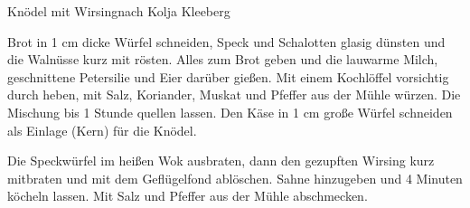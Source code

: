 \begin{recipe}{Knödel mit Wirsing}{nach Kolja Kleeberg}


  \steps
  Brot in 1 cm dicke Würfel schneiden, Speck und Schalotten glasig dünsten und die
  Walnüsse kurz mit rösten. Alles zum Brot geben und die lauwarme Milch, geschnittene
  Petersilie und Eier darüber gießen. Mit einem Kochlöffel vorsichtig durch heben, mit
  Salz, Koriander, Muskat und Pfeffer aus der Mühle würzen.  Die Mischung \halb bis 1
  Stunde quellen lassen. Den Käse in 1 cm große Würfel schneiden als Einlage (Kern) für
  die Knödel.

  Die Speckwürfel im heißen Wok ausbraten, dann den gezupften Wirsing kurz mitbraten und
  mit dem Geflügelfond ablöschen.  Sahne hinzugeben und 4 Minuten köcheln lassen. Mit Salz
  und Pfeffer aus der Mühle abschmecken.
\end{recipe}
